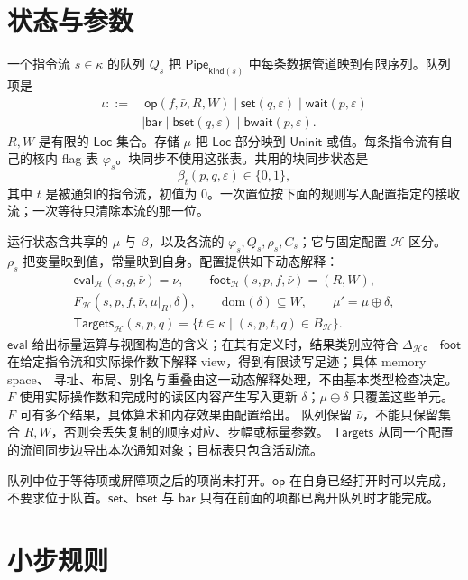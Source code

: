 \documentclass[UTF8,a4paper,11pt,fontset=fandol]{ctexart}
\newcommand{\kw}[1]{\ensuremath{\mathsf{#1}}}
\begin{document}
\section{状态与参数}

一个指令流 $s\in\kappa$ 的队列 $Q_s$ 把 $\mathsf{Pipe}_{\mathsf{kind}(s)}$ 中每条数据管道映到有限序列。队列项是
\[
\begin{aligned}
\iota ::={}
  &\ \kw{op}(f,\bar\nu,R,W)
   \mid \kw{set}(q,\varepsilon)
   \mid \kw{wait}(p,\varepsilon)\\
  &\mid \kw{bar}
   \mid \kw{bset}(q,\varepsilon)
   \mid \kw{bwait}(p,\varepsilon).
\end{aligned}
\]
$R,W$ 是有限的 $\mathsf{Loc}$ 集合。存储 $\mu$ 把 $\mathsf{Loc}$ 部分映到 $\mathsf{Uninit}$ 或值。每条指令流有自己的核内 flag 表 $\varphi_s$。块同步不使用这张表。共用的块同步状态是
\[
\beta_t(p,q,\varepsilon)\in\{0,1\},
\]
其中 $t$ 是被通知的指令流，初值为 $0$。一次置位按下面的规则写入配置指定的接收流；一次等待只清除本流的那一位。

运行状态含共享的 $\mu$ 与 $\beta$，以及各流的 $\varphi_s,Q_s,\rho_s,C_s$；它与固定配置 $\mathcal H$ 区分。
$\rho_s$ 把变量映到值，常量映到自身。配置提供如下动态解释：
\[
\begin{gathered}
\mathsf{eval}_{\mathcal H}(s,g,\bar\nu)=\nu,
\qquad \mathsf{foot}_{\mathcal H}(s,p,f,\bar\nu)=(R,W),\\
F_{\mathcal H}(s,p,f,\bar\nu,\mu|_R,\delta),\qquad
\mathrm{dom}(\delta)\subseteq W,\qquad \mu'=\mu\oplus\delta,\\
\mathsf{Targets}_{\mathcal H}(s,p,q)
 =\{t\in\kappa\mid(s,p,t,q)\in B_{\mathcal H}\}.
\end{gathered}
\]
$\mathsf{eval}$ 给出标量运算与视图构造的含义；在其有定义时，结果类别应符合 $\Delta_{\mathcal H}$。
$\mathsf{foot}$ 在给定指令流和实际操作数下解释 view，得到有限读写足迹；具体 memory space、
寻址、布局、别名与重叠由这一动态解释处理，不由基本类型检查决定。
$F$ 使用实际操作数和完成时的读区内容产生写入更新 $\delta$；$\mu\oplus\delta$ 只覆盖这些单元。
$F$ 可有多个结果，具体算术和内存效果由配置给出。
队列保留 $\bar\nu$，不能只保留集合 $R,W$，否则会丢失复制的顺序对应、步幅或标量参数。
$\mathsf{Targets}$ 从同一个配置的流间同步边导出本次通知对象；目标表只包含活动流。

队列中位于等待项或屏障项之后的项尚未打开。$\kw{op}$ 在自身已经打开时可以完成，不要求位于队首。$\kw{set}$、$\kw{bset}$ 与 $\kw{bar}$ 只有在前面的项都已离开队列时才能完成。

\section{小步规则}
\end{document}
